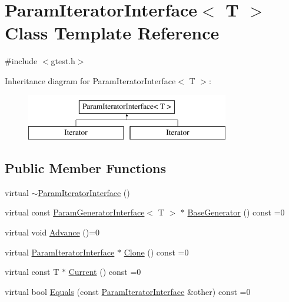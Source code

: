 \hypertarget{classtesting_1_1internal_1_1ParamIteratorInterface}{\section{\-Param\-Iterator\-Interface$<$ \-T $>$ \-Class \-Template \-Reference}
\label{d7/d95/classtesting_1_1internal_1_1ParamIteratorInterface}
}


{\ttfamily \#include $<$gtest.\-h$>$}

\-Inheritance diagram for \-Param\-Iterator\-Interface$<$ \-T $>$\-:\begin{figure}[H]
\begin{center}
\leavevmode
\includegraphics[height=2.000000cm]{d7/d95/classtesting_1_1internal_1_1ParamIteratorInterface}
\end{center}
\end{figure}
\subsection*{\-Public \-Member \-Functions}
\begin{DoxyCompactItemize}
\item 
virtual \hyperlink{classtesting_1_1internal_1_1ParamIteratorInterface_a5970d27b6a00cd1562e3bb64fa4030b4}{$\sim$\-Param\-Iterator\-Interface} ()
\item 
virtual const \*
\hyperlink{classtesting_1_1internal_1_1ParamGeneratorInterface}{\-Param\-Generator\-Interface}$<$ \-T $>$ $\ast$ \hyperlink{classtesting_1_1internal_1_1ParamIteratorInterface_a31ed0ef215b10d69bbd1b480c4451232}{\-Base\-Generator} () const =0
\item 
virtual void \hyperlink{classtesting_1_1internal_1_1ParamIteratorInterface_ac30cd9e8cf3f7a749726c329fdebfd7c}{\-Advance} ()=0
\item 
virtual \hyperlink{classtesting_1_1internal_1_1ParamIteratorInterface}{\-Param\-Iterator\-Interface} $\ast$ \hyperlink{classtesting_1_1internal_1_1ParamIteratorInterface_a13d3ca351e0bd6a00fe9bdd46ae4cd76}{\-Clone} () const =0
\item 
virtual const \-T $\ast$ \hyperlink{classtesting_1_1internal_1_1ParamIteratorInterface_a752f54639dad3c961a7b5ea375db8a01}{\-Current} () const =0
\item 
virtual bool \hyperlink{classtesting_1_1internal_1_1ParamIteratorInterface_a486de897af96e7d4ac5db54640626e75}{\-Equals} (const \hyperlink{classtesting_1_1internal_1_1ParamIteratorInterface}{\-Param\-Iterator\-Interface} \&other) const =0
\end{DoxyCompactItemize}



